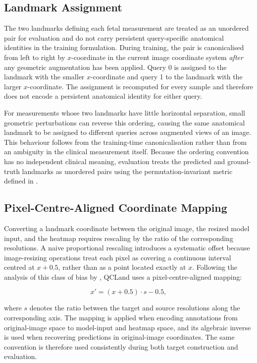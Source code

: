 \subsection{Landmark Assignment}
\label{sec:method-formulation}

The two landmarks defining each fetal measurement are treated as an
unordered pair for evaluation and do not carry persistent
query-specific anatomical identities in the training formulation.
During training, the pair is canonicalised from left to right by
$x$-coordinate in the current image coordinate system
\emph{after} any geometric augmentation has been applied. Query 0 is
assigned to the landmark with the smaller $x$-coordinate and query 1
to the landmark with the larger $x$-coordinate. The assignment is
recomputed for every sample and therefore does not encode a persistent
anatomical identity for either query.

For measurements whose two landmarks have little horizontal
separation, small geometric perturbations can reverse this ordering,
causing the same anatomical landmark to be assigned to different
queries across augmented views of an image. This behaviour follows
from the training-time canonicalisation rather than from an ambiguity
in the clinical measurement itself. Because the ordering convention
has no independent clinical meaning, evaluation treats the predicted
and ground-truth landmarks as unordered pairs using the
permutation-invariant metric defined in .


\subsection{Pixel-Centre-Aligned Coordinate Mapping}
\label{sec:method-udp}

Converting a landmark coordinate between the original image, the
resized model input, and the heatmap requires rescaling by the ratio
of the corresponding resolutions. A naive proportional rescaling
introduces a systematic offset because image-resizing operations treat
each pixel as covering a continuous interval centred at $x+0.5$,
rather than as a point located exactly at $x$. Following the analysis
of this class of bias by \textcite{huang2020udp}, QCLand uses a
pixel-centre-aligned mapping:

\begin{equation}
  \label{eq:udp-scale}
  x'
  =
  (x+0.5)\cdot s - 0.5,
\end{equation}

where $s$ denotes the ratio between the target and source resolutions
along the corresponding axis. The mapping is applied when encoding
annotations from original-image space to model-input and heatmap
space, and its algebraic inverse is used when recovering predictions
in original-image coordinates. The same convention is therefore used
consistently during both target construction and evaluation.


